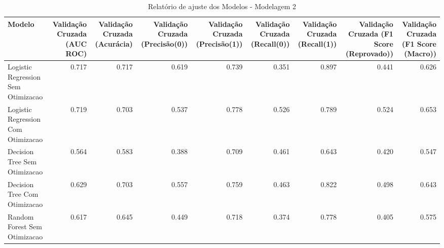 \begin{table}[H] %
    \centering
    \caption{Relatório de ajuste dos Modelos - Modelagem 2}
    \label{tab:relatorio_ajuste_modelagem_2}
    \renewcommand{\arraystretch}{1.25} %
    \begin{adjustwidth}{ -1in }{ -1in } %
    \centering %
    \small %
    \begin{tabular}{lrrrrrrrr}
\toprule
                            Modelo &  Validação Cruzada (AUC ROC) &  Validação Cruzada (Acurácia) &  Validação Cruzada (Precisão(0)) &  Validação Cruzada (Precisão(1)) &  Validação Cruzada (Recall(0)) &  Validação Cruzada (Recall(1)) &  Validação Cruzada (F1 Score (Reprovado)) &  Validação Cruzada (F1 Score (Macro)) \\
\midrule
Logistic Regression Sem Otimizacao &                        0.717 &                         0.717 &                            0.619 &                            0.739 &                          0.351 &                          0.897 &                                     0.441 &                                 0.626 \\
Logistic Regression Com Otimizacao &                        0.719 &                         0.703 &                            0.537 &                            0.778 &                          0.526 &                          0.789 &                                     0.524 &                                 0.653 \\
      Decision Tree Sem Otimizacao &                        0.564 &                         0.583 &                            0.388 &                            0.709 &                          0.461 &                          0.643 &                                     0.420 &                                 0.547 \\
      Decision Tree Com Otimizacao &                        0.629 &                         0.703 &                            0.557 &                            0.759 &                          0.463 &                          0.822 &                                     0.498 &                                 0.643 \\
      Random Forest Sem Otimizacao &                        0.617 &                         0.645 &                            0.449 &                            0.718 &                          0.374 &                          0.778 &                                     0.405 &                                 0.575 \\

\end{tabular}
\end{adjustwidth}
\end{table}
